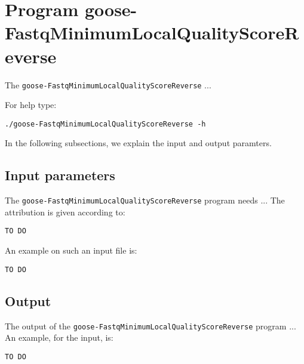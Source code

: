 \section{Program goose-FastqMinimumLocalQualityScoreReverse}
The \texttt{goose-FastqMinimumLocalQualityScoreReverse} ...

For help type:
\begin{lstlisting}
./goose-FastqMinimumLocalQualityScoreReverse -h
\end{lstlisting}
In the following subsections, we explain the input and output paramters.

\subsection*{Input parameters}

The \texttt{goose-FastqMinimumLocalQualityScoreReverse} program needs ...
The attribution is given according to:
\begin{lstlisting}
TO DO
\end{lstlisting}

An example on such an input file is:
\begin{lstlisting}
TO DO
\end{lstlisting}

\subsection*{Output}
The output of the \texttt{goose-FastqMinimumLocalQualityScoreReverse} program ...
An example, for the input, is:
\begin{lstlisting}
TO DO
\end{lstlisting}
